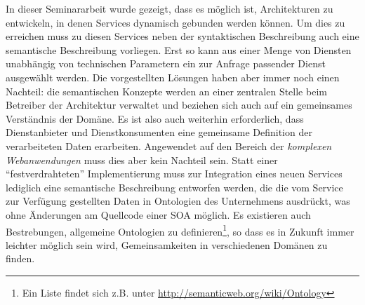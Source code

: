 In dieser Seminararbeit wurde gezeigt, dass es möglich ist, Architekturen zu entwickeln, in denen Services dynamisch gebunden werden können. Um dies zu erreichen muss zu diesen Services neben der syntaktischen Beschreibung auch eine semantische Beschreibung vorliegen. Erst so kann aus einer Menge von Diensten unabhängig von technischen Parametern ein zur Anfrage passender Dienst ausgewählt werden. Die vorgestellten Lösungen haben aber immer noch einen Nachteil: die semantischen Konzepte werden an einer zentralen Stelle beim Betreiber der Architektur verwaltet und beziehen sich auch auf ein gemeinsames Verständnis der Domäne. Es ist also auch weiterhin erforderlich, dass Dienstanbieter und Dienstkonsumenten eine gemeinsame Definition der verarbeiteten Daten erarbeiten. Angewendet auf den Bereich der \emph{komplexen Webanwendungen} muss dies aber kein Nachteil sein. Statt einer "`festverdrahteten"' Implementierung muss zur Integration eines neuen Services lediglich eine semantische Beschreibung entworfen werden, die die vom Service zur Verfügung gestellten Daten in Ontologien des Unternehmens ausdrückt, was ohne Änderungen am Quellcode einer \ac{SOA} möglich. Es existieren auch Bestrebungen, allgemeine Ontologien zu definieren\footnote{Ein Liste findet sich z.B. unter \url{http://semanticweb.org/wiki/Ontology}}, so dass es in Zukunft immer leichter möglich sein wird, Gemeinsamkeiten in verschiedenen Domänen zu finden.